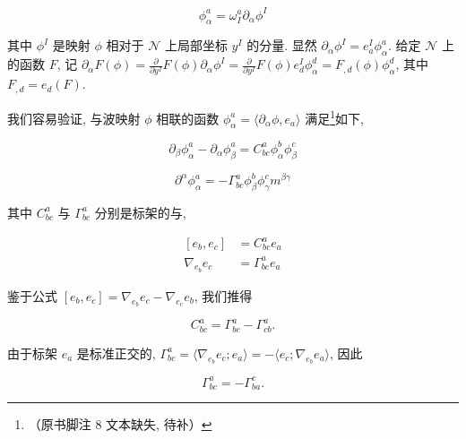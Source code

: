 \begin{equation}
\phi_ {\alpha} ^ {a} = \omega_ {I} ^ {a} \partial_ {\alpha} \phi^ {I}\label{eq:cG-30}
\end{equation}

其中 $\phi^I$ 是映射 $\phi$ 相对于 $\mathcal{N}$ 上局部坐标 $y^{I}$ 的分量. 显然 $\partial_{\alpha}\phi^{I} = e_{a}^{I}\phi_{\alpha}^{a}$. 给定 $\mathcal{N}$ 上的函数 $F$, 记 $\partial_{\alpha}F(\phi) = \frac{\partial}{\partial y^{I}} F(\phi)\partial_{\alpha}\phi^{I} = \frac{\partial}{\partial y^{I}} F(\phi)e_{d}^{I}\phi_{\alpha}^{d} = F_{, d}(\phi)\phi_{\alpha}^{d}$, 其中 $F_{, d} = e_{d}(F)$. 

我们容易验证, 与波映射 $\phi$ 相联的函数 $\phi_{\alpha}^{a}=\langle\partial_{\alpha}\phi, e_{a}\rangle$ 满足\footnote{（原书脚注 8 文本缺失, 待补）}如下, 

\begin{equation}
\partial_ {\beta} \phi_ {\alpha} ^ {a} - \partial_ {\alpha} \phi_ {\beta} ^ {a} = C _ {b c} ^ {a} \phi_ {\alpha} ^ {b} \phi_ {\beta} ^ {c}\label{eq:cG-31}
\end{equation}

\begin{equation}
\partial^ {\alpha} \phi_ {\alpha} ^ {a} = - \Gamma_ {b c} ^ {a} \phi_ {\beta} ^ {b} \phi_ {\gamma} ^ {c} m ^ {\beta \gamma}\label{eq:cG-32}
\end{equation}

其中 $C_{bc}^{a}$ 与 $\Gamma_{bc}^{a}$ 分别是标架的与, 

\[
\begin{aligned}
[e _ {b},  e _ {c}] &= C _ {b c} ^ {a} e _ {a} \\
\nabla_ {e _ {b}} e _ {c} &= \Gamma_ {b c} ^ {a} e _ {a}
\end{aligned}
\]

鉴于公式 $[e_b, e_c] = \nabla_{e_b}e_c - \nabla_{e_c}e_b$, 我们推得

\[
C _ {b c} ^ {a} = \Gamma_ {b c} ^ {a} - \Gamma_ {c b} ^ {a}.
\]

由于标架 $e_a$ 是标准正交的, $\Gamma_{bc}^a = \langle \nabla_{e_b} e_c;  e_a \rangle = - \langle e_c;  \nabla_{e_b} e_a \rangle$, 因此

\begin{equation}
\Gamma_ {b c} ^ {a} = - \Gamma_ {b a} ^ {c}.\label{eq:cG-33}
\end{equation}


